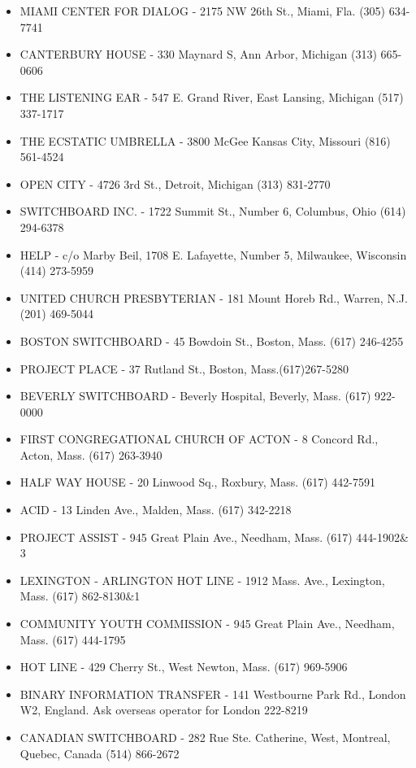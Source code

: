 \documentclass[11pt,twoside,a4paper]{book}
\begin{document}
\begin{minipage}[t]{0.20\textwidth}
\begin{scriptsize}
\begin{itemize}
	\item[] MIAMI CENTER FOR DIALOG - 2175 NW 26th St., Miami, Fla. (305) 634-7741 
	\item[] CANTERBURY HOUSE - 330 Maynard S, Ann Arbor, Michigan (313) 665-0606
	\item[] THE LISTENING EAR - 547 E. Grand River, East Lansing, Michigan (517) 337-1717 
	\item[] THE ECSTATIC UMBRELLA - 3800 McGee Kansas City, Missouri (816) 561-4524 
	\item[] OPEN CITY - 4726 3rd St., Detroit, Michigan (313) 831-2770 
	\item[] SWITCHBOARD INC. - 1722 Summit St., Number 6, Columbus, Ohio (614) 294-6378 
	\item[] HELP - c/o Marby Beil, 1708 E. Lafayette, Number 5, Milwaukee, Wisconsin (414) 273-5959
	\item[] UNITED CHURCH PRESBYTERIAN - 181 Mount Horeb Rd., Warren, N.J. (201) 469-5044 
	\item[] BOSTON SWITCHBOARD - 45 Bowdoin St., Boston, Mass. (617) 246-4255 
	\item[] PROJECT PLACE - 37 Rutland St., Boston, Mass.(617)267-5280 
	\item[] BEVERLY SWITCHBOARD - Beverly Hospital, Beverly, Mass. (617) 922-0000 
	\item[] FIRST CONGREGATIONAL CHURCH OF ACTON - 8 Concord Rd., Acton, Mass. (617) 263-3940 
	\item[] HALF WAY HOUSE - 20 Linwood Sq., Roxbury, Mass. (617) 442-7591 
\end{itemize}
\end{scriptsize}
\end{minipage}\hfill
\begin{minipage}[t]{0.20\textwidth}
\begin{scriptsize}
\begin{itemize}
	\item[] ACID - 13 Linden Ave., Malden, Mass. (617) 342-2218 
	\item[] PROJECT ASSIST - 945 Great Plain Ave., Needham, Mass. (617) 444-1902\& 3 
	\item[] LEXINGTON - ARLINGTON HOT LINE - 1912 Mass. Ave., Lexington, Mass. (617) 862-8130\&1 
	\item[] COMMUNITY YOUTH COMMISSION - 945 Great Plain Ave., Needham, Mass. (617) 444-1795 
	\item[] HOT LINE - 429 Cherry St., West Newton, Mass. (617) 969-5906
	\item[] BINARY INFORMATION TRANSFER - 141 Westbourne Park Rd., London W2, England. Ask overseas operator for London 222-8219 
	\item[] CANADIAN SWITCHBOARD - 282 Rue Ste. Catherine, West, Montreal, Quebec, Canada (514) 866-2672
\end{itemize}
\end{scriptsize}
\end{minipage}\hfill
\end{document}
